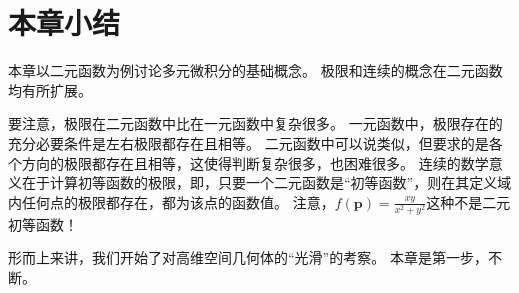 \section{本章小结}

本章以二元函数为例讨论多元微积分的基础概念。
极限和连续的概念在二元函数均有所扩展。

要注意，极限在二元函数中比在一元函数中复杂很多。
一元函数中，极限存在的充分必要条件是左右极限都存在且相等。
二元函数中可以说类似，但要求的是各个方向的极限都存在且相等，这使得判断复杂很多，也困难很多。
连续的数学意义在于计算初等函数的极限，即，只要一个二元函数是“初等函数”，则在其定义域内任何点的极限都存在，都为该点的函数值。
注意，$f\left( \boldsymbol{p} \right) =\frac{xy}{x^2+y^2}$这种不是二元初等函数！

形而上来讲，我们开始了对高维空间几何体的“光滑”的考察。
本章是第一步，不断。





